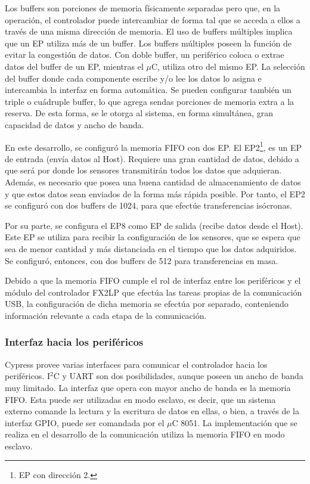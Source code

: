 	Los buffers son porciones de memoria físicamente separadas pero que, en la operación, el controlador puede intercambiar de forma tal que se acceda a ellos a través de una misma dirección de memoria. El uso de buffers múltiples implica que un EP utiliza más de un buffer. Los buffers múltiples poseen la función de evitar la congestión de datos. Con doble buffer, un periférico coloca o extrae datos del buffer de un EP, mientras el $\mu$C, utiliza otro del mismo EP. La selección del buffer donde cada componente escribe y/o lee los datos lo asigna e intercambia la interfaz en forma automática. Se pueden configurar también un triple o cuádruple buffer, lo que agrega sendas porciones de memoria extra a la reserva. De esta forma, se le otorga al sistema, en forma simultánea, gran capacidad de datos y ancho de banda.
	
	En este desarrollo, se configuró la memoria FIFO con dos EP. El EP2\footnote{EP con dirección 2.}, es un EP de entrada (envía datos al Host). Requiere una gran cantidad de datos, debido a que será por donde los sensores transmitirán todos los datos que adquieran. Además, es necesario que posea una buena cantidad de almacenamiento de datos y que estos datos sean enviados de la forma más rápida posible. Por tanto, el EP2 se configuró con dos buffers de \SI{1024}{\byte}, para que efectúe transferencias isócronas.
	
	Por su parte, se configura el EP8 como EP de salida (recibe datos desde el Host). Este EP se utiliza para recibir la configuración de los sensores, que se espera que sea de menor cantidad y más distanciada en el tiempo que los datos adquiridos. Se configuró, entonces, con dos buffers de \SI{512}{\byte} para transferencias en masa.
	
	Debido a que la memoria FIFO cumple el rol de interfaz entre los periféricos y el módulo del controlador FX2LP que efectúa las tareas propias de la comunicación USB, la configuración de dicha memoria se efectúa por separado, conteniendo información relevante a cada etapa de la comunicación.
	
\subsubsection{Interfaz hacia los periféricos}
	Cypress provee varias interfaces para comunicar el controlador hacia los periféricos. I$^2$C y UART son dos posibilidades, aunque poseen un ancho de banda muy limitado. La interfaz que opera con mayor ancho de banda es la memoria FIFO. Esta puede ser utilizadas en modo esclavo, es decir, que un sistema externo comande la lectura y la escritura de datos en ellas, o bien, a través de la interfaz GPIO, puede ser comandada por el $\mu$C 8051. La implementación que se realiza en el desarrollo de la comunicación utiliza la memoria FIFO en modo esclavo.
	

